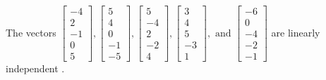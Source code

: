 \begin{exercise}
\begin{exerciseStatement}
  \end{exerciseStatement}
  \begin{exerciseAnswer}
   The vectors \(\left[\begin{array}{r}
-4 \\
2 \\
-1 \\
0 \\
5
\end{array}\right] , \left[\begin{array}{r}
5 \\
4 \\
0 \\
-1 \\
-5
\end{array}\right] , \left[\begin{array}{r}
5 \\
-4 \\
2 \\
-2 \\
4
\end{array}\right] , \left[\begin{array}{r}
3 \\
4 \\
5 \\
-3 \\
1
\end{array}\right] , \text{ and } \left[\begin{array}{r}
-6 \\
0 \\
-4 \\
-2 \\
-1
\end{array}\right]\) are 
  	 linearly independent  .
  


  \end{exerciseAnswer}
\end{exercise}
